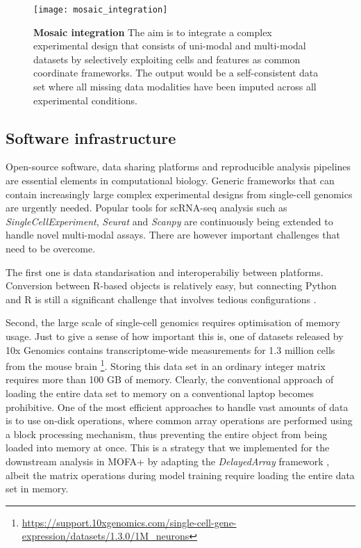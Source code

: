 \begin{figure}[H]
	\centering
	\texttt{[image: mosaic\_integration]}
	\caption[]{
	\textbf{Mosaic integration} The aim is to integrate a complex experimental design that consists of uni-modal and multi-modal datasets by selectively exploiting cells and features as common coordinate frameworks. The output would be a self-consistent data set where all missing data modalities have been imputed across all experimental conditions.}
	\label{fig:mosaic_integration}
\end{figure}


\subsection{Software infrastructure} 

Open-source software, data sharing platforms and reproducible analysis pipelines are essential elements in computational biology. Generic frameworks that can contain increasingly large complex experimental designs from single-cell genomics are urgently needed. Popular tools for scRNA-seq analysis such as \textit{SingleCellExperiment}, \textit{Seurat} and \textit{Scanpy} are continuously being extended to handle novel multi-modal assays. There are however important challenges that need to be overcome. 

The first one is data standarisation and interoperabiliy between platforms. Conversion between R-based objects is relatively easy, but connecting Python and R is still a significant challenge that involves tedious configurations \cite{reticulate}. 

Second, the large scale of single-cell genomics requires optimisation of memory usage. Just to give a sense of how important this is, one of datasets released by 10x Genomics contains transcriptome-wide measurements for 1.3 million cells from the mouse brain \footnote{\url{https://support.10xgenomics.com/single-cell-gene-expression/datasets/1.3.0/1M_neurons}}. Storing this data set in an ordinary integer matrix requires more than 100 GB of memory. Clearly, the conventional approach of loading the entire data set to memory on a conventional laptop becomes prohibitive. One of the most efficient approaches to handle vast amounts of data is to use on-disk operations, where common array operations are performed using a block processing mechanism, thus preventing the entire object from being loaded into memory at once. This is a strategy that we implemented for the downstream analysis in MOFA+ by adapting the \textit{DelayedArray} framework \cite{Herve2020}, albeit the matrix operations during model training require loading the entire data set in memory. 

